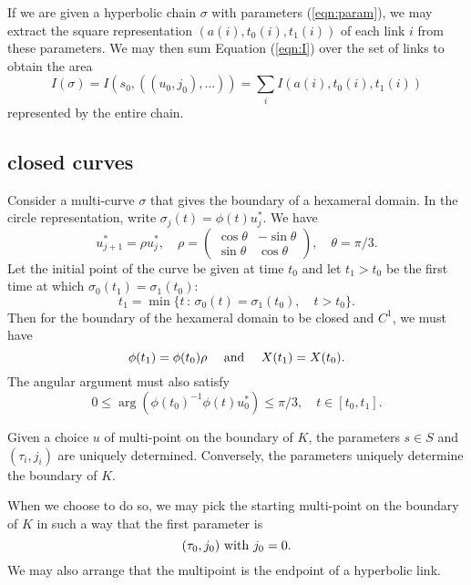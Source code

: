 \documentclass[11pt]{amsart}
\def\ta{{\tau}}
\def\mid{\,:\,}
\begin{document}
If we are given a hyperbolic chain $\sigma$ 
with parameters (\ref{eqn:param}),
we may extract the square representation $(a(i),t_0(i),t_1(i))$
of each
link $i$ from these parameters.  We may then sum Equation (\ref{eqn:I})
over the set of links to obtain the area
\begin{equation}\label{eqn:Isigma}
I(\sigma) = I(s_0,((u_0,j_0),\ldots)) = \sum_i I(a(i),t_0(i),t_1(i))
\end{equation}
represented by the entire chain.

\subsection{closed curves}

Consider a multi-curve $\sigma$ that gives the boundary of a hexameral
domain.  In the circle representation, write $\sigma_j(t) =
\phi(t)u^*_j$.  We have
\[
u^*_{j+1} = \rho u^*_j,\quad \rho=
\left(\begin{array}{ccc} \cos\theta & -\sin\theta\\ 
\sin\theta & \cos\theta\end{array}\right),\quad \theta=\pi/3.
\]
Let the initial point of the curve be given at time $t_0$ and let
$t_1>t_0$ be the first time at which $\sigma_0(t_1) = \sigma_1(t_0)$:
\begin{equation}\label{eqn:t0}
t_1 = \min \{ t \mid \sigma_0(t) = \sigma_1(t_0), \quad t>t_0\}.
\end{equation} 
Then for the boundary of the hexameral domain to be closed
and $C^1$, we must have
\begin{equation}\label{eqn:closed}
\phi(t_1) = \phi(t_0)\rho\quad\hbox{ and }\quad X(t_1) = X(t_0).
\end{equation}
The angular argument must also satisfy
\begin{equation}\label{eqn:arg}
0\le \arg (\phi(t_0)^{-1}\phi(t)u^*_0) \le \pi/3,\quad t\in[t_0,t_1].
\end{equation}

Given a choice $u$ of multi-point on the boundary of $K$, the parameters
$s\in S$ and $(\ta_i,j_i)$ are uniquely determined.  Conversely, the
parameters uniquely determine the boundary of $K$.

When we choose to do so, we may pick the starting multi-point on
the boundary of $K$ in such a way
that the first parameter is
\begin{equation}\label{eqn:j0}
(\ta_0,j_0) \hbox{ with } j_0=0.
\end{equation}  
We may also arrange
that the multipoint is the endpoint of a hyperbolic link.
\end{document}
